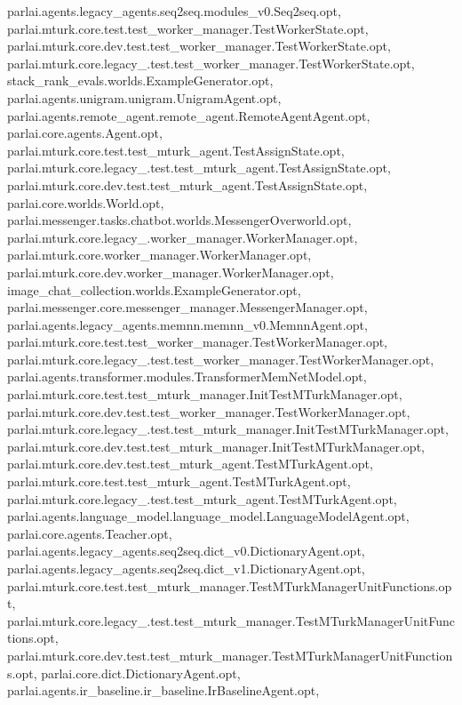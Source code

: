 parlai.\+agents.\+legacy\+\_\+agents.\+seq2seq.\+modules\+\_\+v0.\+Seq2seq.\+opt, parlai.\+mturk.\+core.\+test.\+test\+\_\+worker\+\_\+manager.\+Test\+Worker\+State.\+opt, parlai.\+mturk.\+core.\+dev.\+test.\+test\+\_\+worker\+\_\+manager.\+Test\+Worker\+State.\+opt, parlai.\+mturk.\+core.\+legacy\+\_.\+test.\+test\+\_\+worker\+\_\+manager.\+Test\+Worker\+State.\+opt, stack\+\_\+rank\+\_\+evals.\+worlds.\+Example\+Generator.\+opt, parlai.\+agents.\+unigram.\+unigram.\+Unigram\+Agent.\+opt, parlai.\+agents.\+remote\+\_\+agent.\+remote\+\_\+agent.\+Remote\+Agent\+Agent.\+opt, parlai.\+core.\+agents.\+Agent.\+opt, parlai.\+mturk.\+core.\+test.\+test\+\_\+mturk\+\_\+agent.\+Test\+Assign\+State.\+opt, parlai.\+mturk.\+core.\+legacy\+\_.\+test.\+test\+\_\+mturk\+\_\+agent.\+Test\+Assign\+State.\+opt, parlai.\+mturk.\+core.\+dev.\+test.\+test\+\_\+mturk\+\_\+agent.\+Test\+Assign\+State.\+opt, parlai.\+core.\+worlds.\+World.\+opt, parlai.\+messenger.\+tasks.\+chatbot.\+worlds.\+Messenger\+Overworld.\+opt, parlai.\+mturk.\+core.\+legacy\+\_.\+worker\+\_\+manager.\+Worker\+Manager.\+opt, parlai.\+mturk.\+core.\+worker\+\_\+manager.\+Worker\+Manager.\+opt, parlai.\+mturk.\+core.\+dev.\+worker\+\_\+manager.\+Worker\+Manager.\+opt, image\+\_\+chat\+\_\+collection.\+worlds.\+Example\+Generator.\+opt, parlai.\+messenger.\+core.\+messenger\+\_\+manager.\+Messenger\+Manager.\+opt, parlai.\+agents.\+legacy\+\_\+agents.\+memnn.\+memnn\+\_\+v0.\+Memnn\+Agent.\+opt, parlai.\+mturk.\+core.\+test.\+test\+\_\+worker\+\_\+manager.\+Test\+Worker\+Manager.\+opt, parlai.\+mturk.\+core.\+legacy\+\_.\+test.\+test\+\_\+worker\+\_\+manager.\+Test\+Worker\+Manager.\+opt, parlai.\+agents.\+transformer.\+modules.\+Transformer\+Mem\+Net\+Model.\+opt, parlai.\+mturk.\+core.\+test.\+test\+\_\+mturk\+\_\+manager.\+Init\+Test\+M\+Turk\+Manager.\+opt, parlai.\+mturk.\+core.\+dev.\+test.\+test\+\_\+worker\+\_\+manager.\+Test\+Worker\+Manager.\+opt, parlai.\+mturk.\+core.\+legacy\+\_.\+test.\+test\+\_\+mturk\+\_\+manager.\+Init\+Test\+M\+Turk\+Manager.\+opt, parlai.\+mturk.\+core.\+dev.\+test.\+test\+\_\+mturk\+\_\+manager.\+Init\+Test\+M\+Turk\+Manager.\+opt, parlai.\+mturk.\+core.\+dev.\+test.\+test\+\_\+mturk\+\_\+agent.\+Test\+M\+Turk\+Agent.\+opt, parlai.\+mturk.\+core.\+test.\+test\+\_\+mturk\+\_\+agent.\+Test\+M\+Turk\+Agent.\+opt, parlai.\+mturk.\+core.\+legacy\+\_.\+test.\+test\+\_\+mturk\+\_\+agent.\+Test\+M\+Turk\+Agent.\+opt, parlai.\+agents.\+language\+\_\+model.\+language\+\_\+model.\+Language\+Model\+Agent.\+opt, parlai.\+core.\+agents.\+Teacher.\+opt, parlai.\+agents.\+legacy\+\_\+agents.\+seq2seq.\+dict\+\_\+v0.\+Dictionary\+Agent.\+opt, parlai.\+agents.\+legacy\+\_\+agents.\+seq2seq.\+dict\+\_\+v1.\+Dictionary\+Agent.\+opt, parlai.\+mturk.\+core.\+test.\+test\+\_\+mturk\+\_\+manager.\+Test\+M\+Turk\+Manager\+Unit\+Functions.\+opt, parlai.\+mturk.\+core.\+legacy\+\_.\+test.\+test\+\_\+mturk\+\_\+manager.\+Test\+M\+Turk\+Manager\+Unit\+Functions.\+opt, parlai.\+mturk.\+core.\+dev.\+test.\+test\+\_\+mturk\+\_\+manager.\+Test\+M\+Turk\+Manager\+Unit\+Functions.\+opt, parlai.\+core.\+dict.\+Dictionary\+Agent.\+opt, parlai.\+agents.\+ir\+\_\+baseline.\+ir\+\_\+baseline.\+Ir\+Baseline\+Agent.\+opt, 
